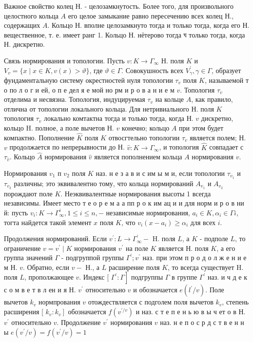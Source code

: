 \documentclass[10pt]{article}
\begin{document}
Важное свойство колец Н. - целозамкнутость. Более того, для произвольного целостного кольца $A$ его целое замыкание равно пересечению всех колец Н., содержащих $A$. Кольцо Н. вполне целозамкнуто тогда и только тогда, когда его Н. вещественное, т. е. имеет ранг 1. Кольцо Н. нётерово тогда ঘ только тогда, когда Н. дискретно.



Связь нормирования и топологии. Пусть $v: K \rightarrow \Gamma_{\infty}$ Н. поля $K$ и $V_{v}=\{x \mid x \in K, v(x)>\vartheta\}$, где $\vartheta \in \Gamma$. Совокушность всех $V_{\gamma}^{\prime}, \gamma \in \Gamma$, образует фундаментальную систему окрестностей нуля топологии $\tau_{v}$ поля $K$, называемой т о по л о г и ей, о п е дел я е мой но рм и р о в а н и е м $v$. Топология $\tau_{v}$ отделима и несвязна. Топология, индуцируемая $\tau_{v}$ на кольце $A$, как правило, отлична от топологии локального кольца. Для нетривиального Н. поля $K$ топология $\tau_{v}$ локально комтактна тогда и только тогда, когда Н. $v$ дискретно, кольцо $\mathrm{H}$. полное, а поле вычетов Н. $v$ конечно; кольцо $A$ при этом будет компактно. Пополнение $\hat{K}$ поля $K$ отвосгтельно топологии $\tau_{v}$ является полем; Н. $v$ продолжается по непрерывности до Н. $\hat{v}: K \rightarrow \Gamma_{\infty}$, и топология $\hat{K}$ совпадает с $\tau_{\hat{v}}$. Кольцо $\hat{A}$ нормирования $\hat{v}$ является пополнением кольца $A$ нормирования $v$.



Нормирования $v_{1}$ п $v_{2}$ поля $K$ наз. н е з а в и с им ы м и, если топологии $\tau_{v_{1}}$ и $\tau_{v_{2}}$ различны; это эквивалентно тому, что кольца нормирований $A_{v_{1}}$ и $A_{v_{2}}$ порождают поле $K$. Неэквивалентные нормирования высоты 1 всегда независимы. Имеет место т е о р е м а а пп р о к им ац и и для норм и р о в ни й: пусть $v_{i}: K \rightarrow \Gamma_{\infty}^{i}, 1 \leqslant i \leqslant n,-$ независимые нормирования, $a_{i} \in K, \alpha_{i} \in \Gamma i$, тогта найдется такой элемент $x$ поля $K$, что $v_{i}\left(x-a_{i}\right) \geqslant \alpha_{i}$ для всех $i$.



Продолжения нормирований. Если $v^{\prime}: L \rightarrow \Gamma_{\infty}^{\prime}-$ H. поля $L$, а $K$ - подполе $L$, то ограничение $v=v^{\prime} \mid K$ нормирования $v^{\prime}$ на поле $K$ является Н. поля $K$, а его группа значений $\Gamma$ - подгруппой группы $\Gamma^{\prime} ; v^{\prime}$ наз. при этом п р о д о л ж е н и е м Н. $v$. Обратно, если $v-$ Н., а $L$ расширение поля $K$, то всегда существует H. поля $L$, прополжающее $v$. Индекс [ $\left.\Gamma^{\prime}: \Gamma\right]$ подгруппы $\Gamma$ в группе $\Gamma^{\prime}$ наз. и ч д е к с о м в е т в л ен и я Н. $v^{\prime}$ относительно $v$ и обозначается $e\left(l^{\prime} / v\right)$. Поле вычетов $k_{v}$ нормпрования $v$ отождествляется с подголем поля вычетов $k_{v}$, степень расширения [ $\left.k_{v}: k_{v}\right]$ обозначается $f\left(v^{\prime / v}\right)$ и наз. с т е п е н ь ю в ы ч ет о в Н. $v^{\prime}$ относительно $v$. Продолжение $v^{\prime}$ нормирования $v$ наз. н $е$ п о с р д с т в е н н ы $e\left(v^{\prime} / v\right)=f\left(v^{\prime} / v\right)=1$
\end{document}

